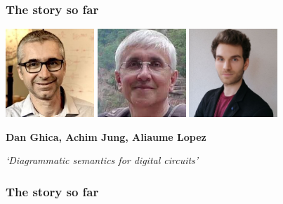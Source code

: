 \begin{frame}
    \frametitle{The story so far}

    \centering

    \includegraphics[width=0.25\textwidth]{imgs/ghica}
    \includegraphics[width=0.25\textwidth]{imgs/achim}
    \includegraphics[width=0.25\textwidth]{imgs/lopez}

    \LARGE
    \textbf{Dan Ghica, Achim Jung, Aliaume Lopez}

    \normalsize
    \emph{`Diagrammatic semantics for digital circuits'}


\end{frame}

\begin{frame}
    \frametitle{The story so far}

    \centering


\end{frame}

